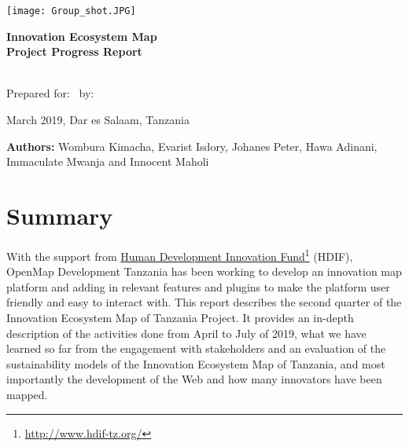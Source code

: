 \documentclass[a4paper,12pt,twoside]{article}
\begin{document}
\thispagestyle{empty}

\begin{center}
\texttt{[image: Group\_shot.JPG]}
\end{center}

\begin{center}
\bigskip
  \Huge 
\color{OMDTZblue} \textbf {Innovation Ecosystem Map}
\\
\textbf{Project Progress Report}
\\
\end{center}
\bigskip \bigskip \bigskip
\\
  \vbox{
  \centering
  Prepared for:
  \
  by:
}
\bigskip  \bigskip \bigskip
\begin{center}
  March 2019, Dar es Salaam, Tanzania  
  
 \bigskip \bigskip \bigskip \bigskip \bigskip \bigskip
\end{center}
 
\begin{flushleft}
	\footnotesize {\textbf{Authors:} Wombura Kimacha, Evarist Isdory, Johanes Peter, Hawa Adinani, Immaculate Mwanja and { } { } { } { } { } { } Innocent Maholi}
\end{flushleft} 
  

\newpage
\tableofcontents

\newpage
\section{Summary}
With the support from \href{http://www.hdif-tz.org/}{Human Development Innovation Fund}\footnote{\url{http://www.hdif-tz.org/}} (HDIF), OpenMap Development Tanzania has been working to develop an innovation map platform and adding in relevant features and plugins to make the platform user friendly and easy to interact with.  This report describes the second quarter of the Innovation Ecosystem Map of Tanzania Project. It provides an in-depth description of the activities done from April to July of 2019, what we have learned so far from the engagement with stakeholders and an evaluation of the sustainability models of the Innovation Ecosystem Map of Tanzania, and most importantly the development of the Web and how many innovators have been mapped.
\end{document}
